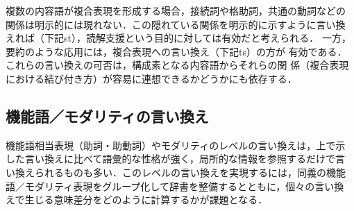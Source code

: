 複数の内容語が複合表現を形成する場合，接続詞や格助詞，共通の動詞などの
関係は明示的には現れない．この隠れている関係を明示的に示すように言い換
えれば（下記s{\ra}t），読解支援という目的に対しては有効だと考えられる．
一方，要約のような応用には，複合表現への言い換え（下記t{\ra}s）の方が
有効である．これらの言い換えの可否は，構成素となる内容語からそれらの関
係（複合表現における結び付き方）が容易に連想できるかどうかにも依存する．

\subsection{機能語／モダリティの言い換え}
\label{ssec:category4}

機能語相当表現（助詞・助動詞）やモダリティのレベルの言い換えは，上で示
した言い換えに比べて語彙的な性格が強く，局所的な情報を参照するだけで言
い換えられるものも多い．このレベルの言い換えを実現するには，同義の機能
語／モダリティ表現をグループ化して辞書を整備するとともに，個々の言い換
えで生じる意味差分をどのように計算するかが課題となる．

